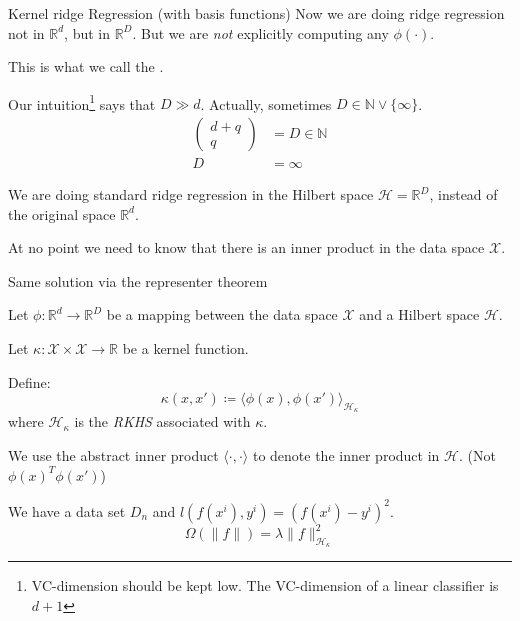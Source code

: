 \begin{example}[breakable]{Kernel ridge Regression (with basis functions)}{}
	Now we are doing ridge regression not in $\mathds R^d$, but in
	$\mathds R^D$. But we are \emph{not} explicitly computing
	any $\phi(\cdot)$.

	This is what we call the .

  Our intuition\footnote{VC-dimension should be kept low.
    The VC-dimension of a linear classifier is $d+1$
  }
  says that $D \gg d$. Actually, sometimes
	$D \in \mathds N \vee \{\infty\}$.
	\begin{align*}
		\begin{pmatrix}
			d + q \\
			q
		\end{pmatrix} & = D \in \mathds N \tag{Polynomial kernel} \\
		D               & = \infty \tag{RBF kernel}
	\end{align*}

  We are doing standard ridge regression in the Hilbert space
  $\mathcal H = \mathds R^D$, instead of the original space $\mathds R^d$.

  \begin{note}
    At no point we need to know that there is an inner product in the
    data space $\mathcal X$.
  \end{note}
\end{example}

\begin{example}{Same solution via the representer theorem}{}

  Let $\phi: \mathds R^d \to \mathds R^D$ be a mapping between
  the data space $\mathcal X$ and a Hilbert space $\mathcal H$.

  Let $\kappa : \mathcal X \times \mathcal X \to \mathds R$ be a kernel
  function.

  Define:
  \begin{equation*}
    \kappa(x, x') \coloneqq \langle \phi(x), \phi(x') \rangle_{\mathcal H_\kappa}
  \end{equation*}
  where $\mathcal H_\kappa$ is the \emph{RKHS} associated with $\kappa$.
  \begin{note}
    We use the abstract inner product $\langle \cdot, \cdot \rangle$ to
    denote the inner product in $\mathcal H$. (Not $\phi(x)^T \phi(x')$)
  \end{note}

  We have a data set $D_n$ and $l(f(x^i), y^i) = (f(x^i) - y^i)^2$.
  \begin{equation*}
    \Omega(\lVert f \rVert) =\lambda\lVert f \rVert_{\mathcal H_\kappa}^2
  \end{equation*}


\end{example}


